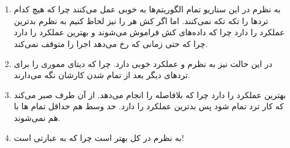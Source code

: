 \section{}
\begin{enumerate}
    \item به نظرم در این سناریو تمام الگوریتم‌ها به خوبی عمل می‌کنند چرا که هیچ کدام ترد‌ها را تکه تکه نمی‌کنند.
    اما اگر کش هر
    را نیز لحاظ کنیم به نظرم
    بدترین عملکرد را دارد چرا که داده‌های کش فراموش می‌شوند و
    بهترین عملکرد را دارد چرا که حتی زمانی که
    رخ می‌دهد اجرا را متوقف نمی‌کند.
    \item در این حالت نیز به نظرم
     و 
    عملکرد خوبی دارد. چرا که دیتای مموری را برای ترد‌های دیگر بعد از تمام شدن کارشان نگه می‌دارند.
    \item {} بهترین عملکرد را دارد چرا که بلافاصله 
    را انجام می‌دهد. از آن طرف
    صبر می‌کند که کار ترد تمام شود پس بدترین عملکرد را دارد. حد وسط هم
     حداقل تمام ها
    با هم
    نمی‌شوند.
    \item به نظرم در کل  بهتر است چرا که به عبارتی
    است!
\end{enumerate}